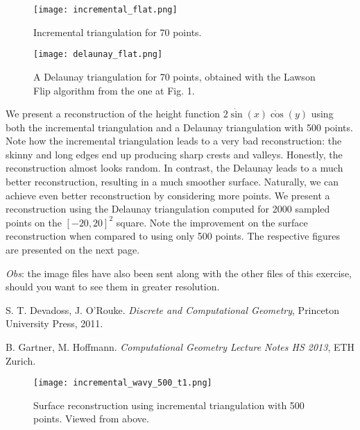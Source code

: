 \documentclass[a4paper, 10pt, conference]{ieeeconf}      %
\begin{document}
\begin{figure}[h]
	\begin{center}
   		\texttt{[image: incremental\_flat.png]}
   		\label{fig:incremental_flat}
    	\caption{Incremental triangulation for 70 points.}
    \end{center}
\end{figure}

\begin{figure}[h]
	\begin{center}
   		\texttt{[image: delaunay\_flat.png]}
    	\caption{A Delaunay triangulation for 70 points, obtained with the Lawson Flip algorithm from the one at Fig. 1.}
    \end{center}
\end{figure}

We present a reconstruction of the height function $2 \dot \sin(x) \dot \cos(y)$ using both the incremental triangulation and a Delaunay triangulation with 500 points.
Note how the incremental triangulation leads to a very bad reconstruction: the skinny and long edges end up producing sharp crests and valleys.
Honestly, the reconstruction almost looks random.
In contrast, the Delaunay leads to a much better reconstruction, resulting in a much smoother surface.
Naturally, we can achieve even better reconstruction by considering more points.
We present a reconstruction using the Delaunay triangulation computed for 2000 sampled points on the $[-20,20]^2$ square.
Note the improvement on the surface reconstruction when compared to using only 500 points.
The respective figures are presented on the next page.

\textit{Obs}: the image files have also been sent along with the other files of this exercise, should you want to see them in greater resolution.

\begin{thebibliography}{99}

S. T. Devadoss, J. O'Rouke.
\textit{Discrete and Computational Geometry}, 
Princeton University Press, 2011.

B. Gartner, M. Hoffmann. 
\textit{Computational Geometry Lecture Notes HS 2013},
ETH Zurich.

\end{thebibliography}

\begin{figure}[h]
	\begin{center}
   		\texttt{[image: incremental\_wavy\_500\_t1.png]}
    	\caption{Surface reconstruction using incremental triangulation with 500 points. Viewed from above.}
    \end{center}
\end{figure}
\end{document}
